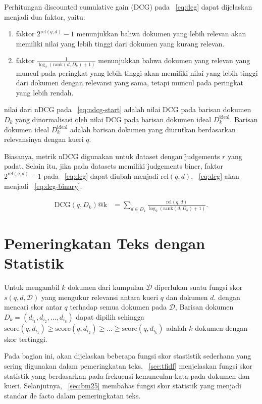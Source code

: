         Perhitungan \f{discounted cumulative gain} (DCG) pada \equ~\ref{eq:dcg} dapat dijelaskan menjadi dua faktor, yaitu:
        \begin{enumerate}
            \item faktor $2^{\text{rel}(q, d)} - 1$ menunjukkan bahwa dokumen yang lebih relevan akan memiliki nilai yang lebih tinggi dari dokumen yang kurang relevan.
            \item faktor $\frac{1}{\log_2(\text{rank}(d, D_k) + 1)}$ menunjukkan bahwa dokumen yang relevan yang muncul pada peringkat yang lebih tinggi akan memiliki nilai yang lebih tinggi dari dokumen dengan relevansi yang sama, tetapi muncul pada peringkat yang lebih rendah.
        \end{enumerate}

        nilai dari nDCG pada \equ~\ref{eq:ndcg-start} adalah nilai DCG pada barisan dokumen $D_k$ yang dinormalisasi oleh nilai DCG pada barisan dokumen ideal $D_k^{\text{ideal}}$. Barisan dokumen ideal $D_k^{\text{ideal}}$ adalah barisan dokumen yang diurutkan berdasarkan relevansinya dengan kueri $q$.

        Biasanya, metrik nDCG digunakan untuk \f{dataset} dengan \f{judgements} $r$ yang padat. Selain itu, jika pada \f{datasets} memiliki \f{judgements} biner, faktor $2^{\text{rel}(q, d)} - 1$ pada \equ~\ref{eq:dcg} dapat diubah menjadi $\text{rel}(q, d)$. \equ~\ref{eq:dcg} akan menjadi \equ~\ref{eq:dcg-binary}.
        
        \begin{align}
        \label{eq:dcg-binary}
        \text{DCG}(q, D_k)\text{@k} &= \sum_{d \in D_k} \frac{\text{rel}(q, d)}{\log_2(\text{rank}(d, D_k) + 1)}.
        \end{align}


\section{Pemeringkatan Teks dengan Statistik}
        Untuk mengambil $k$ dokumen dari kumpulan $\mathcal{D}$ diperlukan suatu fungsi skor $s(q, d, \mathcal{D})$ yang mengukur relevansi antara kueri $q$ dan dokumen $d$. dengan mencari skor antar $q$ terhadap semua dokumen pada $\mathcal{D}$, Barisan dokumen $D_k = (d_{i_1}, d_{i_2},\dots, d_{i_k})$ dapat dipilih sehingga $\text{score}(q, d_{i_1}) \geq \text{score}(q, d_{i_2}) \geq \dots \geq \text{score}(q, d_{i_k})$ adalah $k$ dokumen dengan skor tertinggi.
        
        Pada bagian ini, akan dijelaskan beberapa fungsi skor stastistik sederhana yang sering digunakan dalam pemeringkatan teks. \sect~\ref{sec:tfidf} menjelaskan fungsi skor statistik yang berdasarkan pada frekuensi kemunculan kata pada dokumen dan kueri. Selanjutnya, \sect~\ref{sec:bm25} membahas fungsi skor statistik yang menjadi standar \f{de facto} dalam pemeringkatan teks.


